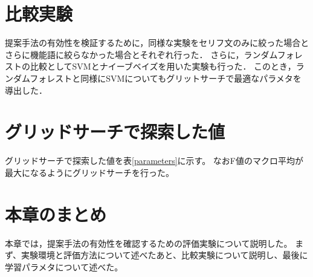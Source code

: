 \section{比較実験}
提案手法の有効性を検証するために，同様な実験をセリフ文のみに絞った場合とさらに機能語に絞らなかった場合とそれぞれ行った．
さらに，ランダムフォレストの比較としてSVMとナイーブベイズを用いた実験も行った．
このとき，ランダムフォレストと同様にSVMについてもグリットサーチで最適なパラメタを導出した．

\section{グリッドサーチで探索した値}
グリッドサーチで探索した値を表\ref{parameters}に示す。
なおF値のマクロ平均が最大になるようにグリッドサーチを行った。

\begin{table}[H]
 \centering
  \caption{グリッドサーチで探索したパラメタ}
  \vspace{0.3\baselineskip}
  \label{parameters}
\end{table}

\section{本章のまとめ}
本章では，提案手法の有効性を確認するための評価実験について説明した。
まず、実験環境と評価方法について述べたあと、比較実験について説明し、最後に学習パラメタについて述べた。
